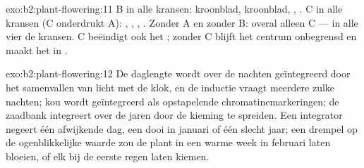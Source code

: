 \begin{solution}{exo:b2:plant-flowering:11}
B in alle kransen: kroonblad, kroonblad, , . C in alle
kransen (C onderdrukt A): , , , .
Zonder A en zonder B: overal alleen C ---  in alle vier de
kransen. C beëindigt ook het ; zonder C blijft het centrum
onbegrensd en maakt het  in .
\end{solution}

\begin{solution}{exo:b2:plant-flowering:12}
De daglengte wordt over de nachten geïntegreerd door het samenvallen van
licht met de klok, en de inductie vraagt meerdere zulke nachten; kou wordt
geïntegreerd als opstapelende chromatinemarkeringen; de zaadbank integreert
over de jaren door de kieming te spreiden. Een integrator negeert één
afwijkende dag, een dooi in januari of één slecht jaar; een drempel op de
ogenblikkelijke waarde zou de plant in een warme week in februari laten
bloeien, of elk  bij de eerste regen laten kiemen.
\end{solution}

